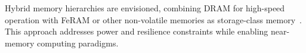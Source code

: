 Hybrid memory hierarchies are envisioned, combining DRAM for high-speed operation with FeRAM or other non-volatile memories as storage-class memory~\cite{itrs2022, samsung2021}. 
This approach addresses power and resilience constraints while enabling near-memory computing paradigms.
